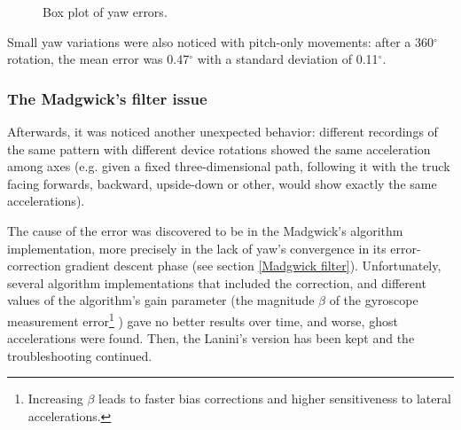 \begin{center}
	\begin{figure}[ht!]
		\caption{Box plot of yaw errors.}
	\end{figure}
\end{center}

Small yaw variations were also noticed with pitch-only movements: after a 360$^{\circ}$ rotation, the mean error was 0.47$^{\circ}$ with a standard deviation of 0.11$^{\circ}$.

\subsubsection{The Madgwick's filter issue}
Afterwards, it was noticed another unexpected behavior: different recordings of the same pattern with different device rotations showed the same acceleration among axes (e.g. given a fixed three-dimensional path, following it with the truck facing forwards, backward, upside-down or other, would show exactly the same accelerations).
\bigbreak

The cause of the error was discovered to be in the Madgwick's algorithm implementation, more precisely in the lack of yaw's convergence in its error-correction gradient descent phase (see section \ref{Madgwick filter}). Unfortunately, several algorithm implementations that included the correction, and different values of the algorithm's gain parameter (the magnitude $\beta$ of the gyroscope measurement error\footnote{Increasing $\beta$ leads to faster bias corrections and higher sensitiveness to lateral accelerations.} \cite[13]{Mad10}) gave no better results over time, and worse, ghost accelerations were found. Then, the Lanini's version has been kept and the troubleshooting continued.

